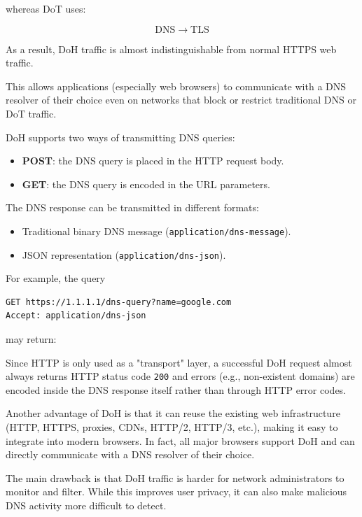 whereas DoT uses:

\[
\text{DNS} \;\rightarrow\; \text{TLS}
\]

As a result, DoH traffic is almost indistinguishable from normal HTTPS web traffic. 

This allows applications (especially web browsers) to communicate with a DNS resolver of their choice even on networks that block or restrict traditional DNS or DoT traffic.

DoH supports two ways of transmitting DNS queries:

\begin{itemize}
    \item \textbf{POST}: the DNS query is placed in the HTTP request body.
    \item \textbf{GET}: the DNS query is encoded in the URL parameters.
\end{itemize}

The DNS response can be transmitted in different formats:

\begin{itemize}
    \item Traditional binary DNS message (\texttt{application/dns-message}).
    \item JSON representation (\texttt{application/dns-json}).
\end{itemize}

For example, the query

\begin{lstlisting}
GET https://1.1.1.1/dns-query?name=google.com
Accept: application/dns-json
\end{lstlisting}

may return:

Since HTTP is only used as a "transport" layer, a successful DoH request almost always returns HTTP status code \texttt{200} and errors (e.g., non-existent domains) are encoded inside the DNS response itself rather than through HTTP error codes.

Another advantage of DoH is that it can reuse the existing web infrastructure (HTTP, HTTPS, proxies, CDNs, HTTP/2, HTTP/3, etc.), making it easy to integrate into modern browsers. In fact, all major browsers support DoH and can directly communicate with a DNS resolver of their choice.

The main drawback is that DoH traffic is harder for network administrators to monitor and filter. While this improves user privacy, it can also make malicious DNS activity more difficult to detect.

